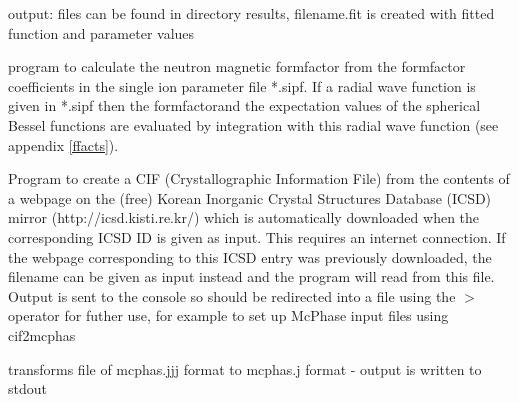 \begin{description}
 output:  files can be found in directory results, filename.fit is created with fitted function and parameter values
\item[\prg formfactor\index{formfactor} *.sipf] program to calculate the neutron magnetic formfactor
from the formfactor coefficients in the single ion parameter file *.sipf. If a radial wave function is given in *.sipf
then the formfactorand the expectation values of the spherical Bessel functions  are evaluated by integration
with this radial wave function (see appendix \ref{ffacts}).
\item[\prg icsdread\index{icsdread}\label{icsdread} $\langle$ICSD\_ID$\rangle$ $>$ INPUT.CIF] 
Program to create a CIF (Crystallographic Information File) from the contents of a webpage on the (free)
Korean Inorganic Crystal Structures Database (ICSD) mirror (http://icsd.kisti.re.kr/) which is automatically 
downloaded when the corresponding ICSD ID is given as input. This requires an internet connection. If the 
webpage corresponding to this ICSD entry was previously downloaded, the filename can be given as input instead
and the program will read from this file. Output is sent to the console so should be redirected into a file
using the {\prg $>$} operator for futher use, for example to set up McPhase input files using {\prg cif2mcphas}

\item [\prg jjj2j:] transforms file of {\prg mcphas.jjj} format to {\prg %
mcphas.j} format
- output is written to stdout


\end{description}
